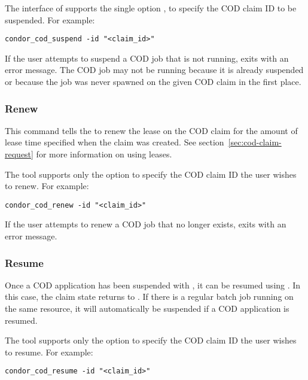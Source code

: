 The interface of 
supports the single option , to specify the COD claim ID
to be suspended.
For example:
\begin{verbatim}
condor_cod_suspend -id "<claim_id>"
\end{verbatim}

If the user attempts to suspend a COD job that is not running,
 exits with an error message.
The COD job may not be running 
because it is already suspended or because the job was never spawned on
the given COD claim in the first place.


\subsubsection{\label{sec:cod-claim-resume}Renew}

This command tells the  to renew the lease on the COD
claim for the amount of lease time specified when the claim was
created.  See section~\ref{sec:cod-claim-request} for more information
on using leases.

The  tool supports only the  option to
specify the COD claim ID the user wishes to renew.
For example:
\begin{verbatim}
condor_cod_renew -id "<claim_id>"
\end{verbatim}

If the user attempts to renew a COD job that no longer exists,
 exits with an error message.

\subsubsection{\label{sec:cod-claim-resume}Resume}

Once a COD application has been suspended with ,
it can be resumed using .
In this case, the claim state returns to \verb@Running@.
If there is a regular batch job running on the same resource, it will
automatically be suspended if a COD application is resumed.

The  tool supports only the  option to
specify the COD claim ID the user wishes to resume.
For example:
\begin{verbatim}
condor_cod_resume -id "<claim_id>"
\end{verbatim}

